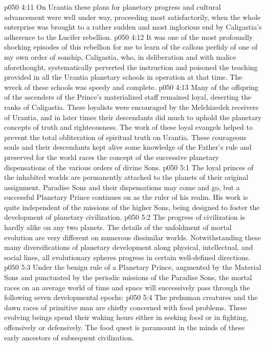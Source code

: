 \vs p050 4:11 \pc On Urantia these plans for planetary progress and cultural advancement were well under way, proceeding most satisfactorily, when the whole enterprise was brought to a rather sudden and most inglorious end by Caligastia’s adherence to the Lucifer rebellion.
\vs p050 4:12 It was one of the most profoundly shocking episodes of this rebellion for me to learn of the callous perfidy of one of my own order of sonship, Caligastia, who, in deliberation and with malice aforethought, systematically perverted the instruction and poisoned the teaching provided in all the Urantia planetary schools in operation at that time. The wreck of these schools was speedy and complete.
\vs p050 4:13 Many of the offspring of the ascenders of the Prince’s materialized staff remained loyal, deserting the ranks of Caligastia. These loyalists were encouraged by the Melchizedek receivers of Urantia, and in later times their descendants did much to uphold the planetary concepts of truth and righteousness. The work of these loyal evangels helped to prevent the total obliteration of spiritual truth on Urantia. These courageous souls and their descendants kept alive some knowledge of the Father’s rule and preserved for the world races the concept of the successive planetary dispensations of the various orders of divine Sons.
\vs p050 5:1 The loyal princes of the inhabited worlds are permanently attached to the planets of their original assignment. Paradise Sons and their dispensations may come and go, but a successful Planetary Prince continues on as the ruler of his realm. His work is quite independent of the missions of the higher Sons, being designed to foster the development of planetary civilization.
\vs p050 5:2 The progress of civilization is hardly alike on any two planets. The details of the unfoldment of mortal evolution are very different on numerous dissimilar worlds. Notwithstanding these many diversifications of planetary development along physical, intellectual, and social lines, all evolutionary spheres progress in certain well\hyp{}defined directions.
\vs p050 5:3 Under the benign rule of a Planetary Prince, augmented by the Material Sons and punctuated by the periodic missions of the Paradise Sons, the mortal races on an average world of time and space will successively pass through the following seven developmental epochs:
\vs p050 5:4 \bibnobreakspace {} The prehuman creatures and the dawn races of primitive man are chiefly concerned with food problems. These evolving beings spend their waking hours either in seeking food or in fighting, offensively or defensively. The food quest is paramount in the minds of these early ancestors of subsequent civilization.
